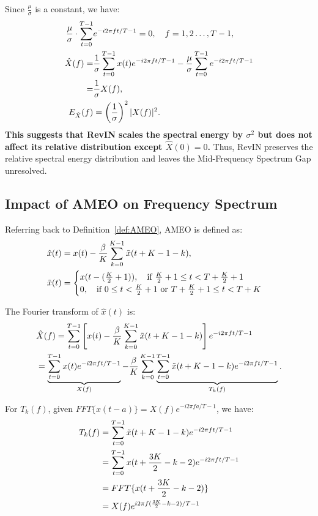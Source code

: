 Since $\frac{\mu}{\sigma}$ is a constant, we have:
\begin{align}
\frac{\mu}{\sigma} \cdot \sum_{t=0}^{T-1}& e^{-i 2 \pi f t / {T-1}} = 0,\quad  f = 1,2\dots,T-1 ,\notag\\
\hat{X}(f)=&\frac{1}{\sigma} \sum_{t=0}^{T-1} x(t) e^{-i 2 \pi f t / {T-1}} - \frac{\mu}{\sigma} \sum_{t=0}^{T-1} e^{-i 2 \pi f t / {T-1}}\notag\\
=&\frac{1}{\sigma}X(f),\notag\\
E_{\hat{X}}(f)& = \left( \frac{1}{\sigma} \right)^2 |X(f)|^2. 
\end{align}
\textbf{This suggests that RevIN scales the spectral energy by $ \sigma^2 $ but does not affect its relative distribution except $\hat{X}(0)=0$.} Thus, RevIN preserves the relative spectral energy distribution and leaves the Mid-Frequency Spectrum Gap unresolved.


\subsection{Impact of AMEO on Frequency Spectrum}
\label{app:AMEO}

Referring back to Definition~\ref{def:AMEO}, AMEO is defined as: 
\begin{align}
&\hat{x}(t) = x(t)-\frac{\beta}{K}\sum_{k=0}^{K-1} \tilde{x}(t+K-1-k),\notag\\
&\tilde{x}(t) =
\begin{cases}
x(t-(\frac{K}{2}+1)), \quad \text{if } \frac{K}{2}+1 \leq t < T+\frac{K}{2}+1 \\
0,  \quad\text{if } 0 \leq t < \frac{K}{2}+1 \text{ or } T+\frac{K}{2}+1 \leq t < T+K
\end{cases}
\end{align}

The Fourier transform of $\hat{x}(t)$ is:
\begin{align}
&\hat{X}(f) = \sum_{t=0}^{T-1} \left[ x(t) - \frac{\beta}{K} \sum_{k=0}^{K-1} \tilde{x}(t + K - 1 - k) \right] e^{-i 2 \pi f t / {T-1}} \notag\\
&= \underbrace{\sum_{t=0}^{T-1} x(t) e^{-i 2 \pi f t / {T-1}}}_{X(f)} - \frac{\beta}{K} \sum_{k=0}^{K-1} \underbrace{\sum_{t=0}^{T-1} \tilde{x}(t + K - 1 - k) e^{-i 2 \pi f t / {T-1}}}_{T_k(f)}.
\end{align}

For $T_k(f)$, given $FFT\{x(t-a)\}=X(f)e^{-i 2 \pi f a / {T-1}}$, we have:
\begin{align}
T_k(f)&=\sum_{t=0}^{T-1} \tilde{x}(t + K - 1 - k) e^{-i 2 \pi f t / {T-1}}\notag\\
&=\sum_{t=0}^{T-1} x(t + \frac{3K}{2} - k-2) e^{-i 2 \pi f t / {T-1}}\notag\\
&=FFT\{x(t + \frac{3K}{2} - k-2)\}\notag\\
&=X(f)e^{i 2 \pi f (\frac{3K}{2} - k-2) / {T-1}}
\end{align}

